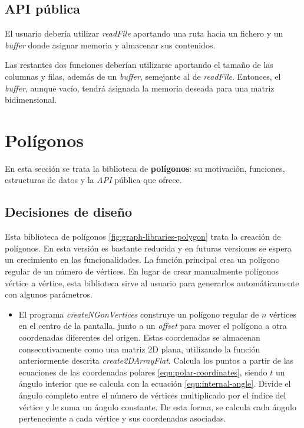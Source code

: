 \subsection{API pública}
El usuario debería utilizar \textit{readFile} aportando una ruta hacia un fichero y un \textit{buffer} donde asignar memoria y almacenar sus contenidos.

Las restantes dos funciones deberían utilizarse aportando el tamaño de las columnas y filas, además de un \textit{buffer}, semejante al de \textit{readFile}. Entonces, el \textit{buffer}, aunque vacío, tendrá asignada la memoria deseada para una matriz bidimensional.

\section{Polígonos} \label{sec:lib-polygon}
En esta sección se trata la biblioteca de \textbf{polígonos}: su motivación, funciones, estructuras de datos y la \textit{API} pública que ofrece.

\subsection{Decisiones de diseño}

Esta biblioteca de polígonos \ref{fig:graph-libraries-polygon} trata la creación de polígonos. En esta versión es bastante reducida y en futuras versiones se espera un crecimiento en las funcionalidades. La función principal crea un polígono regular de un número de vértices. En lugar de crear manualmente polígonos vértice a vértice, esta biblioteca sirve al usuario para generarlos automáticamente con algunos parámetros.

\begin{itemize}

    \item El programa \textit{createNGonVertices} construye un polígono regular de $n$ vértices en el centro de la pantalla, junto a un \textit{offset} para mover el polígono a otra coordenadas diferentes del origen. Estas coordenadas se almacenan consecutivamente como una matriz 2D plana, utilizando la función anteriormente descrita \textit{create2DArrayFlat}. Calcula los puntos a partir de las ecuaciones de las coordenadas polares \ref{equ:polar-coordinates}, siendo $t$ un ángulo interior que se calcula con la ecuación \ref{equ:internal-angle}. Divide el ángulo completo entre el número de vértices multiplicado por el índice del vértice y le suma un ángulo constante. De esta forma, se calcula cada ángulo perteneciente a cada vértice y sus coordenadas asociadas.
    
\end{itemize}

